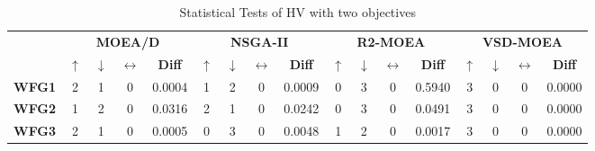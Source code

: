 \begin{table*}[t]
\caption{Statistical Tests of HV with two objectives}
\label{tab:Tests_HV_2obj}
\centering
\begin{tabular}{c|c|c|c|c|c|c|c|c|c|c|c|c|c|c|c|c|}
\cline{2-17}
\textbf{}                            & \multicolumn{4}{c|}{\textbf{MOEA/D}}                                                       & \multicolumn{4}{c|}{\textbf{NSGA-II}}                                                      & \multicolumn{4}{c|}{\textbf{R2-MOEA}}                                                      & \multicolumn{4}{c|}{\textbf{VSD-MOEA}}                                                     \\ \cline{2-17} 
                                     & \textbf{$\uparrow$} & \textbf{$\downarrow$} & \textbf{$\leftrightarrow$} & \textbf{Diff}   & \textbf{$\uparrow$} & \textbf{$\downarrow$} & \textbf{$\leftrightarrow$} & \textbf{Diff}   & \textbf{$\uparrow$} & \textbf{$\downarrow$} & \textbf{$\leftrightarrow$} & \textbf{Diff}   & \textbf{$\uparrow$} & \textbf{$\downarrow$} & \textbf{$\leftrightarrow$} & \textbf{Diff}   \\ \hline
\multicolumn{1}{|c|}{\textbf{WFG1}}  & 2                   & 1                     & 0                          & 0.0004          & 1                   & 2                     & 0                          & 0.0009          & 0                   & 3                     & 0                          & 0.5940          & 3                   & 0                     & 0                          & 0.0000          \\ \hline
\multicolumn{1}{|c|}{\textbf{WFG2}}  & 1                   & 2                     & 0                          & 0.0316          & 2                   & 1                     & 0                          & 0.0242          & 0                   & 3                     & 0                          & 0.0491          & 3                   & 0                     & 0                          & 0.0000          \\ \hline
\multicolumn{1}{|c|}{\textbf{WFG3}}  & 2                   & 1                     & 0                          & 0.0005          & 0                   & 3                     & 0                          & 0.0048          & 1                   & 2                     & 0                          & 0.0017          & 3                   & 0                     & 0                          & 0.0000          \\ \hline

\end{tabular}
\end{table*}

